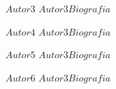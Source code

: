 \documentclass[12pt,journal,compsoc]{IEEEtran}
\begin{document}
\begin{IEEEbiographynophoto}{$Autor3$}
$Autor3Biografia$
\end{IEEEbiographynophoto}

\begin{IEEEbiographynophoto}{$Autor4$}
$Autor3Biografia$
\end{IEEEbiographynophoto}

\begin{IEEEbiographynophoto}{$Autor5$}
$Autor3Biografia$
\end{IEEEbiographynophoto}

\begin{IEEEbiographynophoto}{$Autor6$}
$Autor3Biografia$
\end{IEEEbiographynophoto}
\end{document}
